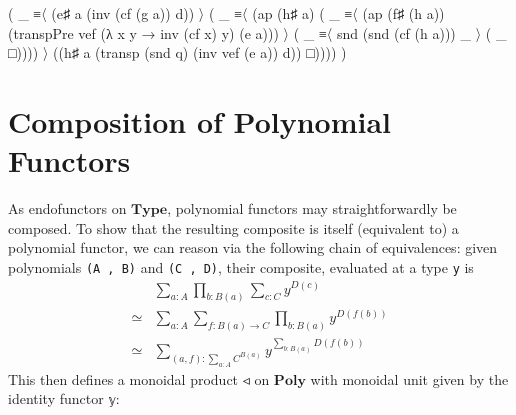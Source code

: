 \documentclass[
  11pt,
  oneside,
  article]{memoir}
\newenvironment{Shaded}{}{}
\newcommand{\NormalTok}[1]{#1}
\newcommand{\OtherTok}[1]{\textcolor[rgb]{0.00,0.44,0.13}{#1}}
\theoremstyle{definition}
\theoremstyle{plain}
\newcommand{\Cat}[1]{\mathbf{#1}}%
\newcommand{\poly}{\Cat{Poly}}
\newcommand{\0}{\textsf{0}}
\newcommand{\1}{\tn{\textsf{1}}}
\begin{document}
\begin{Shaded}
\begin{Highlighting}[]
               \OtherTok{(} \OtherTok{\_}\NormalTok{ ≡〈 }\OtherTok{(}\NormalTok{e♯ a }\OtherTok{(}\NormalTok{inv }\OtherTok{(}\NormalTok{cf }\OtherTok{(}\NormalTok{g a}\OtherTok{))}\NormalTok{ d}\OtherTok{))}\NormalTok{ 〉 }
               \OtherTok{(} \OtherTok{\_}\NormalTok{ ≡〈 }\OtherTok{(}\NormalTok{ap }\OtherTok{(}\NormalTok{h♯ a}\OtherTok{)} 
                           \OtherTok{(} \OtherTok{\_}\NormalTok{ ≡〈 }\OtherTok{(}\NormalTok{ap }\OtherTok{(}\NormalTok{f♯ }\OtherTok{(}\NormalTok{h a}\OtherTok{))} 
                                       \OtherTok{(}\NormalTok{transpPre vef }
                                         \OtherTok{(λ}\NormalTok{ x y }\OtherTok{→}\NormalTok{ inv }\OtherTok{(}\NormalTok{cf x}\OtherTok{)}\NormalTok{ y}\OtherTok{)} 
                                         \OtherTok{(}\NormalTok{e a}\OtherTok{)))}\NormalTok{ 〉 }
                           \OtherTok{(} \OtherTok{\_}\NormalTok{ ≡〈 snd }\OtherTok{(}\NormalTok{snd }\OtherTok{(}\NormalTok{cf }\OtherTok{(}\NormalTok{h a}\OtherTok{)))} \OtherTok{\_}\NormalTok{ 〉 }
                           \OtherTok{(} \OtherTok{\_}\NormalTok{ □}\OtherTok{))))}\NormalTok{ 〉}
               \OtherTok{((}\NormalTok{h♯ a }\OtherTok{(}\NormalTok{transp }\OtherTok{(}\NormalTok{snd q}\OtherTok{)} \OtherTok{(}\NormalTok{inv vef }\OtherTok{(}\NormalTok{e a}\OtherTok{))}\NormalTok{ d}\OtherTok{))}\NormalTok{ □}\OtherTok{))))} \OtherTok{)}
\end{Highlighting}
\end{Shaded}

\section{Composition of Polynomial
Functors}\label{composition-of-polynomial-functors}

As endofunctors on \(\mathbf{Type}\), polynomial functors may
straightforwardly be composed. To show that the resulting composite is
itself (equivalent to) a polynomial functor, we can reason via the
following chain of equivalences: given polynomials \texttt{(A\ ,\ B)}
and \texttt{(C\ ,\ D)}, their composite, evaluated at a type \texttt{y}
is \[
\begin{array}{rl}
& \sum_{a : A} \prod_{b : B(a)} \sum_{c : C} y^{D(c)}\\
\simeq & \sum_{a : A} \sum_{f : B(a) \to C} \prod_{b : B(a)} y^{D(f(b))}\\
\simeq & \sum_{(a , f) : \sum_{a : A} C^{B(a)}} y^{\sum_{b : B(a)} D(f(b))}
\end{array}
\] This then defines a monoidal product \(◃\) on \(\poly\) with
monoidal unit given by the identity functor \texttt{𝕪}:
\end{document}
